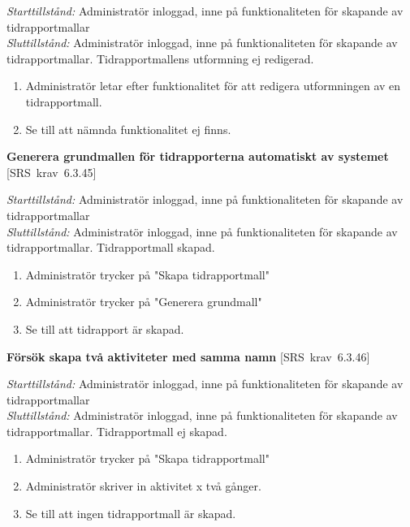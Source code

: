 \documentclass[a4paper]{article}
\def\reqinside{\hfil\penalty 100 \hfilneg \hbox}
\def \req [#1]{\reqinside{[SRS krav #1]}}
\begin{document}
\begin{FT}
\emph{Starttillstånd:} Administratör inloggad, inne på funktionaliteten för skapande av tidrapportmallar\\
\emph{Sluttillstånd:} Administratör inloggad, inne på funktionaliteten för skapande av tidrapportmallar. Tidrapportmallens utformning ej redigerad.\\

\begin{enumerate}
\item Administratör letar efter funktionalitet för att redigera utformningen av en tidrapportmall.
\item Se till att nämnda funktionalitet ej finns.
\end{enumerate}



\item
\textbf{Generera grundmallen för tidrapporterna automatiskt av systemet} \req[6.3.45]

\emph{Starttillstånd:} Administratör inloggad, inne på funktionaliteten för skapande av tidrapportmallar\\
\emph{Sluttillstånd:} Administratör inloggad, inne på funktionaliteten för skapande av tidrapportmallar. Tidrapportmall skapad.\\

\begin{enumerate}
\item Administratör trycker på "Skapa tidrapportmall"
\item Administratör trycker på "Generera grundmall"
\item Se till att tidrapport är skapad.
\end{enumerate}


\item
\textbf{Försök skapa två aktiviteter med samma namn} \req[6.3.46]

\emph{Starttillstånd:} Administratör inloggad, inne på funktionaliteten för skapande av tidrapportmallar\\
\emph{Sluttillstånd:} Administratör inloggad, inne på funktionaliteten för skapande av tidrapportmallar. Tidrapportmall ej skapad.\\

\begin{enumerate}
\item Administratör trycker på "Skapa tidrapportmall"
\item Administratör skriver in aktivitet x två gånger.
\item Se till att ingen tidrapportmall är skapad.
\end{enumerate}



\end{FT}
\end{document}
